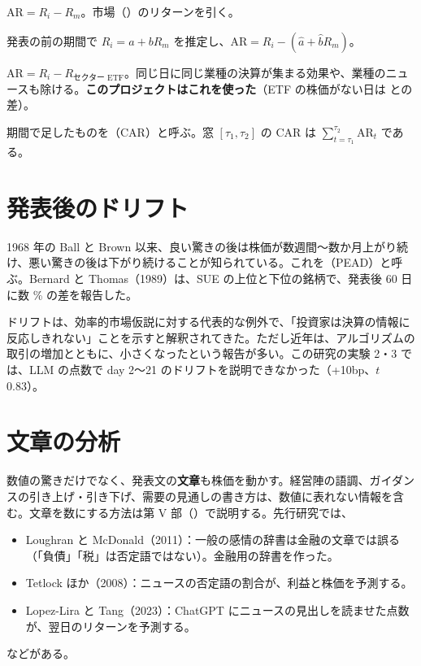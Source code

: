 \begin{description}[leftmargin=1.5em,style=nextline]
\item[市場調整] $\text{AR} = R_i - R_m$。市場（\SP{}）のリターンを引く。
\item[市場モデル] 発表の前の期間で $R_i = a + bR_m$ を推定し、$\text{AR} = R_i - (\hat a + \hat b R_m)$。
\item[セクター調整] $\text{AR} = R_i - R_{\text{セクター ETF}}$。同じ日に同じ業種の決算が集まる効果や、業種のニュースも除ける。\textbf{このプロジェクトはこれを使った}（ETF の株価がない日は \SP{} との差）。
\end{description}

期間で足したものを（CAR）と呼ぶ。窓 $[\tau_1,\tau_2]$ の CAR は $\sum_{t=\tau_1}^{\tau_2}\text{AR}_t$ である。

\section{発表後のドリフト}

1968 年の Ball と Brown 以来、良い驚きの後は株価が数週間〜数か月上がり続け、悪い驚きの後は下がり続けることが知られている。これを（PEAD）と呼ぶ。Bernard と Thomas（1989）は、SUE の上位と下位の銘柄で、発表後 60 日に数 \% の差を報告した。

ドリフトは、効率的市場仮説に対する代表的な例外で、「投資家は決算の情報に反応しきれない」ことを示すと解釈されてきた。ただし近年は、アルゴリズムの取引の増加とともに、小さくなったという報告が多い。この研究の実験 2・3 では、LLM の点数で day 2〜21 のドリフトを説明できなかった（+10bp、$t$ 0.83）。

\section{文章の分析}

数値の驚きだけでなく、発表文の\textbf{文章}も株価を動かす。経営陣の語調、ガイダンスの引き上げ・引き下げ、需要の見通しの書き方は、数値に表れない情報を含む。文章を数にする方法は第 V 部（）で説明する。先行研究では、
\begin{itemize}
\item Loughran と McDonald（2011）：一般の感情の辞書は金融の文章では誤る（「負債」「税」は否定語ではない）。金融用の辞書を作った。
\item Tetlock ほか（2008）：ニュースの否定語の割合が、利益と株価を予測する。
\item Lopez-Lira と Tang（2023）：ChatGPT にニュースの見出しを読ませた点数が、翌日のリターンを予測する。
\end{itemize}
などがある。

